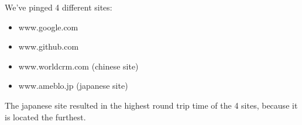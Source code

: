 We've pinged 4 different sites:
\begin{itemize}
	\item www.google.com
	\item www.github.com
	\item www.worldcrm.com (chinese site)
	\item www.ameblo.jp (japanese site)
\end{itemize}
The japanese site resulted in the highest round trip time of the 4 sites, because it is located the furthest. \newline



\newpage


